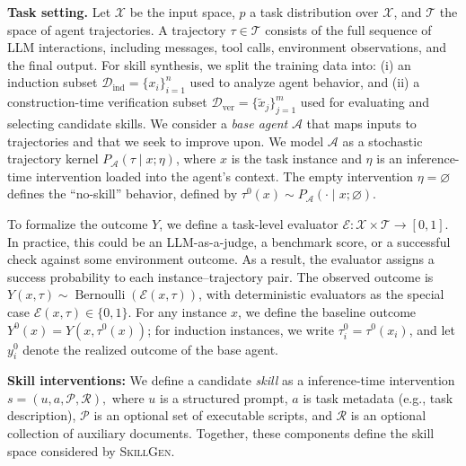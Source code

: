 \documentclass{article}
\begin{document}
\textbf{Task setting.} Let $\mathcal{X}$ be the input space, $p$ a task distribution over $\mathcal{X}$, and $\mathcal{T}$ the space of agent trajectories. A trajectory $\tau \in \mathcal{T}$ consists of the full sequence of LLM interactions, including messages, tool calls, environment observations, and the final output. For skill synthesis, we split the training data into: (i) an induction subset $\mathcal{D}_{\mathrm{ind}}=\{x_i\}_{i=1}^{n}$ used to analyze agent behavior, and (ii) a construction-time verification subset $\mathcal{D}_{\mathrm{ver}}=\{\tilde{x}_j\}_{j=1}^{m}$ used for evaluating and selecting candidate skills. We consider a \emph{base agent} $\mathcal{A}$ that maps inputs to trajectories and that we seek to improve upon. We model $\mathcal{A}$ as a stochastic trajectory kernel $P_{\mathcal{A}}(\tau\mid x;\eta)$,
where $x$ is the task instance and $\eta$ is an inference-time intervention loaded into the agent's context.
The empty intervention $\eta=\varnothing$ defines the ``no-skill'' behavior, defined by $\tau^{0}(x)\sim P_{\mathcal{A}}(\cdot\mid x;\varnothing)$.






 To formalize the outcome $Y$, we define a task-level evaluator $\mathcal{E}:\mathcal{X}\times\mathcal{T}\!\rightarrow\![0,1]$. In practice, this could be an LLM-as-a-judge, a benchmark score, or a successful check against some environment outcome. As a result, the evaluator assigns a success probability to each instance--trajectory pair. The observed outcome is $Y(x,\tau)\sim\operatorname{Bernoulli}(\mathcal{E}(x,\tau))$, with deterministic evaluators as the special case $\mathcal{E}(x,\tau)\in\{0,1\}$. For any instance $x$, we define the baseline outcome $Y^{0}(x)=Y(x,\tau^{0}(x))$; for induction instances, we write $\tau_i^{0}=\tau^{0}(x_i)$, and let $y_i^{0}$ denote the realized outcome of the base agent.










\textbf{Skill interventions:} We define a candidate \emph{skill} as a
inference-time intervention $s=(u,a,\mathcal{P},\mathcal{R}),$
where $u$ is a structured prompt, $a$ is task metadata (e.g., task description), $\mathcal{P}$ is an optional set of executable scripts, and $\mathcal{R}$ is an optional collection of auxiliary documents.
Together, these components define the skill space considered by \textsc{SkillGen}.
\end{document}

